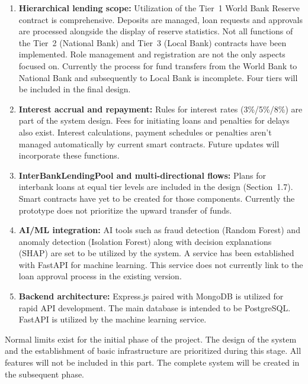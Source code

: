 \documentclass[12pt,a4paper]{report}
\begin{document}
\begin{enumerate}[noitemsep]
\item \textbf{Hierarchical lending scope:} Utilization of the Tier~1 World Bank Reserve contract is comprehensive. Deposits are managed, loan requests and approvals are processed alongside the display of reserve statistics. Not all functions of the Tier~2 (National Bank) and Tier~3 (Local Bank) contracts have been implemented. Role management and registration are not the only aspects focused on. Currently the process for fund transfers from the World Bank to National Bank and subsequently to Local Bank is incomplete. Four tiers will be included in the final design.

\item \textbf{Interest accrual and repayment:} Rules for interest rates (3\%/5\%/8\%) are part of the system design. Fees for initiating loans and penalties for delays also exist. Interest calculations, payment schedules or penalties aren't managed automatically by current smart contracts. Future updates will incorporate these functions.

\item \textbf{InterBankLendingPool and multi-directional flows:} Plans for interbank loans at equal tier levels are included in the design (Section~1.7). Smart contracts have yet to be created for those components. Currently the prototype does not prioritize the upward transfer of funds.

\item \textbf{AI/ML integration:} AI tools such as fraud detection (Random Forest) and anomaly detection (Isolation Forest) along with decision explanations (SHAP) are set to be utilized by the system. A service has been established with FastAPI for machine learning. This service does not currently link to the loan approval process in the existing version.

\item \textbf{Backend architecture:} Express.js paired with MongoDB is utilized for rapid API development. The main database is intended to be PostgreSQL. FastAPI is utilized by the machine learning service.
\end{enumerate}

Normal limits exist for the initial phase of the project. The design of the system and the establishment of basic infrastructure are prioritized during this stage. All features will not be included in this part. The complete system will be created in the subsequent phase.
\end{document}
